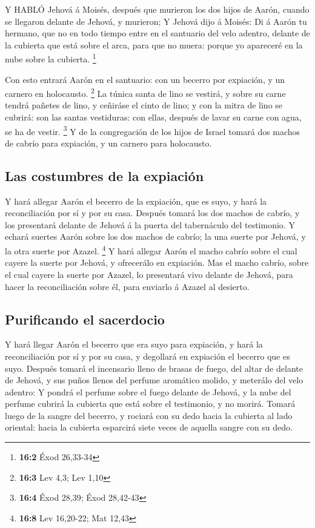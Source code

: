  Y HABLÓ Jehová á Moisés, después que murieron los dos hijos
de Aarón, cuando se llegaron delante de Jehová, y murieron; 
Y Jehová dijo á Moisés: Di á Aarón tu hermano, que no en todo tiempo
entre en el santuario del velo adentro, delante de la cubierta que está
sobre el arca, para que no muera: porque yo apareceré en la nube sobre
la cubierta. \footnote{\textbf{16:2} Éxod 26,33-34}

 Con esto entrará Aarón en el santuario: con un becerro por
expiación, y un carnero en holocausto. \footnote{\textbf{16:3} Lev 4,3;
  Lev 1,10}  La túnica santa de lino se vestirá, y sobre su
carne tendrá pañetes de lino, y ceñiráse el cinto de lino; y con la
mitra de lino se cubrirá: son las santas vestiduras: con ellas, después
de lavar su carne con agua, se ha de vestir. \footnote{\textbf{16:4}
  Éxod 28,39; Éxod 28,42-43}  Y de la congregación de los
hijos de Israel tomará dos machos de cabrío para expiación, y un carnero
para holocausto.

\hypertarget{las-costumbres-de-la-expiaciuxf3n}{%
\subsection{Las costumbres de la
expiación}\label{las-costumbres-de-la-expiaciuxf3n}}

 Y hará allegar Aarón el becerro de la expiación, que es
suyo, y hará la reconciliación por sí y por su casa. 
Después tomará los dos machos de cabrío, y los presentará delante de
Jehová á la puerta del tabernáculo del testimonio.  Y echará
suertes Aarón sobre los dos machos de cabrío; la una suerte por Jehová,
y la otra suerte por Azazel. \footnote{\textbf{16:8} Lev 16,20-22; Mat
  12,43}  Y hará allegar Aarón el macho cabrío sobre el cual
cayere la suerte por Jehová, y ofrecerálo en expiación. 
Mas el macho cabrío, sobre el cual cayere la suerte por Azazel, lo
presentará vivo delante de Jehová, para hacer la reconciliación sobre
él, para enviarlo á Azazel al desierto.

\hypertarget{purificando-el-sacerdocio}{%
\subsection{Purificando el sacerdocio}\label{purificando-el-sacerdocio}}

 Y hará llegar Aarón el becerro que era suyo para
expiación, y hará la reconciliación por sí y por su casa, y degollará en
expiación el becerro que es suyo.  Después tomará el
incensario lleno de brasas de fuego, del altar de delante de Jehová, y
sus puños llenos del perfume aromático molido, y meterálo del velo
adentro:  Y pondrá el perfume sobre el fuego delante de
Jehová, y la nube del perfume cubrirá la cubierta que está sobre el
testimonio, y no morirá.  Tomará luego de la sangre del
becerro, y rociará con su dedo hacia la cubierta al lado oriental: hacia
la cubierta esparcirá siete veces de aquella sangre con su dedo.

